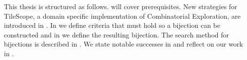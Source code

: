 This thesis is structured as follows.  will cover prerequisites. New strategies for TileScope, a domain specific implementation of Combinatorial Exploration, are introduced in . In  we define criteria that must hold so a bijection can be constructed and in  we define the resulting bijection. The search method for bijections is described in . We state notable successes in  and reflect on our work in .
